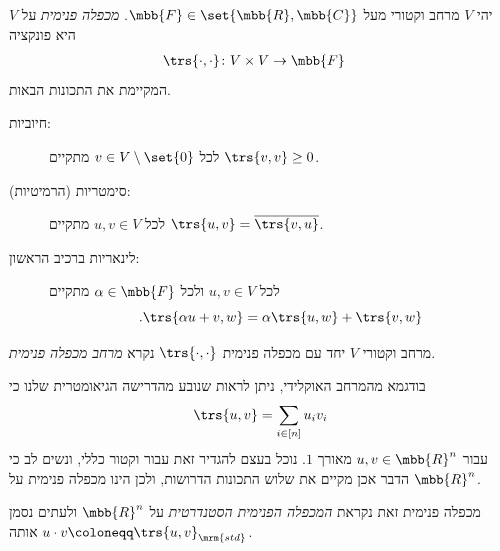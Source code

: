 \documentclass[a4paper,10pt,twoside,openany]{book}
\begin{document}
\begin{definition}
יהי
$V$
מרחב וקטורי מעל
$\mbb{F} \in \set{\mbb{R}, \mbb{C}}$.
\emph{מכפלה פנימית}
על
$V$
היא פונקציה
\begin{align*}
\trs{\cdot,\cdot} \colon V \times V &\to \mbb{F}
\end{align*}
המקיימת את התכונות הבאות.
\begin{description}
\item[חיוביות:]
לכל
$v \in V \setminus \set{0}$
מתקיים
$\trs{v,v} \geq 0$.

\item[סימטריות (הרמיטיות):]
לכל
$u,v \in V$
מתקיים
$\trs{u,v} = \overline{\trs{v,u}}$.

\item[לינאריות ברכיב הראשון:]
לכל
$u,v \in V$
ולכל
$\alpha \in \mbb{F}$
מתקיים
\[\text{.}\trs{\alpha u + v, w} = \alpha\trs{u,w} + \trs{v,w}\]
\end{description}

מרחב וקטורי
$V$
יחד עם מכפלה פנימית
$\trs{\cdot,\cdot}$
נקרא
\emph{מרחב מכפלה פנימית}.
\end{definition}

\begin{remark}
בודגמא מהמרחב האוקלידי, ניתן לראות שנובע מהדרישה הגיאומטרית שלנו כי
\[\trs{u,v} = \sum_{i \in [n]} u_i v_i\]
עבור
$u,v \in \mbb{R}^n$
מאורך
$1$.
נוכל בעצם להגדיר זאת עבור וקטור כללי, ונשים לב כי הדבר אכן מקיים את שלוש התכונות הדרושות, ולכן הינו מכפלה פנימית על
$\mbb{R}^n$.

מכפלה פנימית זאת נקראת
\emph{המכפלה הפנימית הסטנדרטית}
על
$\mbb{R}^n$
ולעתים נסמן אותה
$u \cdot v \coloneqq \trs{u,v}_{\mrm{std}}$.
\end{remark}
\end{document}
